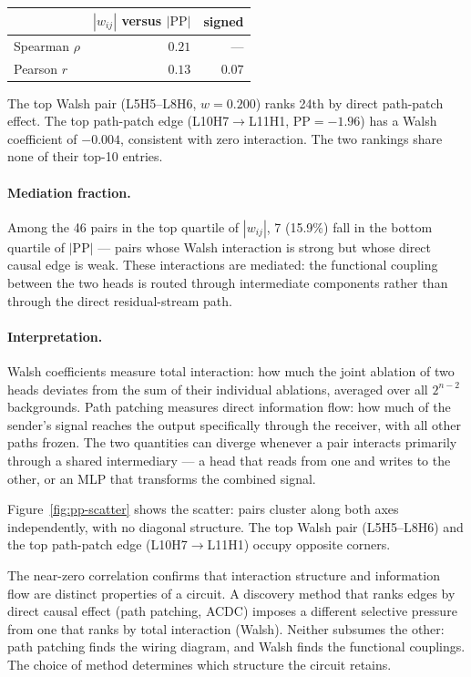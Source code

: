 \documentclass{article}
\begin{document}
\medskip

\begin{tabular}{lrr}
\toprule
 & $|w_{ij}|$ versus $|\text{PP}|$ & signed \\
\midrule
Spearman $\rho$  & $0.21$ & --- \\
Pearson $r$      & $0.13$ & $0.07$ \\
\bottomrule
\end{tabular}

\medskip

The top Walsh pair (L5H5--L8H6, $w = 0.200$) ranks 24th by direct
path-patch effect. The top path-patch edge (L10H7$\to$L11H1,
$\text{PP} = -1.96$) has a Walsh coefficient of $-0.004$, consistent
with zero interaction. The two rankings share none of their top-10 entries.

\paragraph{Mediation fraction.}

Among the 46 pairs in the top quartile of $|w_{ij}|$, 7 (15.9\%) fall
in the bottom quartile of $|\text{PP}|$ --- pairs whose Walsh interaction
is strong but whose direct causal edge is weak. These interactions are
mediated: the functional coupling between the two heads is routed through
intermediate components rather than through the direct residual-stream
path.

\paragraph{Interpretation.}

Walsh coefficients measure total interaction: how much the joint
ablation of two heads deviates from the sum of their individual
ablations, averaged over all $2^{n-2}$ backgrounds. Path patching
measures direct information flow: how much of the sender's signal
reaches the output specifically through the receiver, with all other
paths frozen. The two quantities can diverge whenever a pair interacts
primarily through a shared intermediary --- a head that reads from one
and writes to the other, or an MLP that transforms the combined signal.

Figure~\ref{fig:pp-scatter} shows the scatter: pairs cluster along both
axes independently, with no diagonal structure. The top Walsh pair
(L5H5--L8H6) and the top path-patch edge (L10H7$\to$L11H1) occupy
opposite corners.

The near-zero correlation confirms that interaction structure and
information flow are distinct properties of a circuit. A discovery method
that ranks edges by direct causal effect (path patching, ACDC) imposes a
different selective pressure from one that ranks by total interaction
(Walsh). Neither subsumes the other: path patching finds the wiring
diagram, and Walsh finds the functional couplings. The choice of method
determines which structure the circuit retains.
\end{document}
